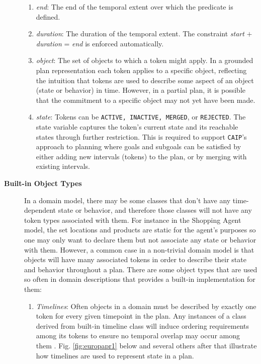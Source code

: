 \begin{description}
\begin{enumerate}
  \item \textit {end}: The end of the temporal extent over which the
    predicate is defined.

  \item \textit {duration}: The duration of the temporal extent. The
    constraint \textit{start} $+$ \textit{duration} = \textit{end} is
    enforced automatically.

  \item \textit{object}: The set of objects to which a token might
    apply. In a grounded plan representation each token applies to a
    specific object, reflecting the intuition that tokens are used to
    describe some aspect of an object (\ie state or behavior) in
    time. However, in a partial plan, it is possible that the
    commitment to a specific object may not yet have been made.

  \item \textit{state}: Tokens can be \texttt{ACTIVE, INACTIVE,
      MERGED}, or \texttt{REJECTED}. The state variable captures the
    token's current state and its reachable states through further
    restriction.  This is required to support \texttt{CAIP}'s approach
    to planning where goals and subgoals can be satisfied by either
    adding new intervals (tokens) to the plan, or by merging with
    existing intervals.
    
  \end{enumerate}

\item[\textbf{Built-in Object Types}] In a domain model, there may be
  some classes that don't have any time-dependent state or behavior,
  and therefore those classes will not have any token types associated
  with them. For instance in the Shopping Agent model, the set
  locations and products are static for the agent's purposes so one
  may only want to declare them but not associate any state or
  behavior with them.  However, a common case in a non-trivial domain
  model is that objects will have many associated tokens in order to
  describe their state and behavior throughout a plan. There are some
  object types that are used so often in domain descriptions that \eu
  provides a built-in implementation for them:

\begin{enumerate}

\item \textit{Timelines}: Often objects in a domain must be described
  by exactly one token for every given timepoint in the plan. Any
  instances of a class derived from \eus built-in timeline class will
  induce ordering requirements among its tokens to ensure no temporal
  overlap may occur among them \cite{mus94}. Fig. \ref{fig:europapr1} below and several others
  after that illustrate how timelines are used to represent state in a plan.


\end{enumerate}
\end{description}
